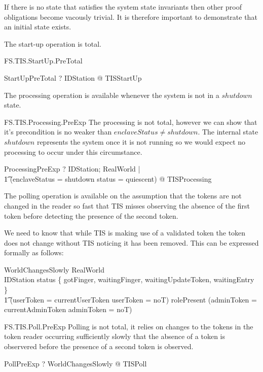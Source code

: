 If there is no state that satisfies the system state invariants then
other proof obligations become vacously trivial. It is therefore
important to demonstrate that an initial state exists.

The start-up operation is total.

\begin{Zpobtrace}{FS.TIS.StartUp.PreTotal}
\begin{theorem}
StartUpPreTotal \vdash? \forall IDStation @ \pre TISStartUp
\end{theorem}
\end{Zpobtrace}

The processing operation is available whenever the system is not in a
$shutdown$ state.

\begin{Zpobtrace}{FS.TIS.Processing.PreExp}
The processing is not total, however we can show that it's precondition
is no weaker than $enclaveStatus \neq shutdown$. The internal state
$shutdown$ represents the system once it is not running so we would
expect no processing to occur under this circumstance. 

\begin{theorem}
ProcessingPreExp \vdash? \forall
        IDStation; RealWorld | 
\\ \t1 \lnot (enclaveStatus = shutdown \land status = quiescent) @ \pre TISProcessing
\end{theorem}
\end{Zpobtrace}

The polling operation is available on the assumption that the tokens
are not changed in the reader so fast that TIS misses observing the
absence of the first token before detecting the presence of the 
second token.
\label{sec:PollPre}

We need to know that while TIS is making use of a validated token the
token does not change without TIS noticing it has been removed. This
can be expressed formally as follows:

\begin{schema}{WorldChangesSlowly}
RealWorld
\\ IDStation
\where
status \in \{ gotFinger, waitingFinger, waitingUpdateToken,
waitingEntry \} \implies
\\ \t1
(userToken = 
currentUserToken 
\lor userToken = noT)
\also
rolePresent \neq \Nil \implies
(adminToken = 
currentAdminToken 
\lor adminToken = noT)
\end{schema}

\begin{Zpobtrace}{FS.TIS.Poll.PreExp}
Polling is not total, it relies on changes to the tokens in the token
reader occurring sufficiently slowly that the absence of a token is
observered before the presence of a second token is observed.
\begin{theorem}
PollPreExp \vdash? \forall WorldChangesSlowly @ \pre TISPoll
\end{theorem}
\end{Zpobtrace}

